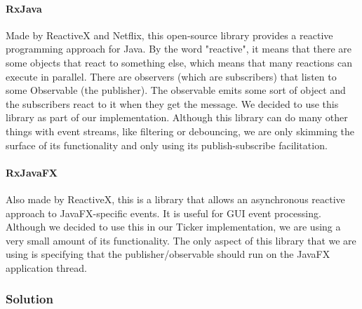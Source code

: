 \documentclass[a4paper,11pt,titlepage]{article}
\begin{document}
\paragraph{RxJava}
Made by ReactiveX and Netflix, this open-source library provides a reactive programming approach for Java. By the word "reactive", it means that there are some objects that react to something else, which means that many reactions can execute in parallel. There are observers (which are subscribers) that listen to some Observable (the publisher). The observable emits some sort of object and the subscribers react to it when they get the message. We decided to use this library as part of our implementation. Although this library can do many other things with  event streams, like filtering or debouncing, we are only skimming the surface of its functionality and only using its publish-subscribe facilitation.
\paragraph{RxJavaFX}
Also made by ReactiveX, this is a library that allows an asynchronous reactive approach to JavaFX-specific events. It is useful for GUI event processing. Although we decided to use this in our Ticker implementation, we are using a very small amount of its functionality. The only aspect of this library that we are using is specifying that the publisher/observable should run on the JavaFX application thread.

\subsubsection{Solution}
\end{document}
